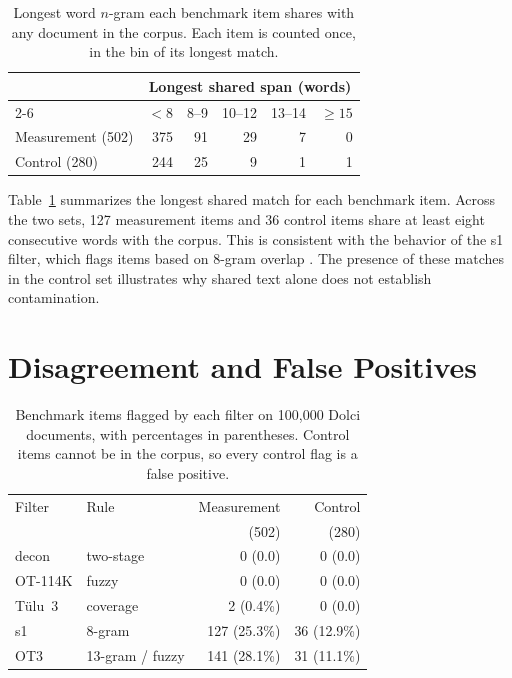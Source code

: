 \documentclass[11pt]{article}
\begin{document}
\begin{table}[t]
  \centering
  \small
  \setlength{\tabcolsep}{5pt}
  \begin{tabular}{@{}l rrrrr@{}}
    \toprule
    & \multicolumn{5}{c}{Longest shared span (words)} \\
    \cmidrule(l){2-6}
    & $<8$ & 8--9 & 10--12 & 13--14 & $\geq 15$ \\
    \midrule
    Measurement (502) & 375 & 91 & 29 & 7 & 0 \\
    Control (280)     & 244 & 25 &  9 & 1 & 1 \\
    \bottomrule
  \end{tabular}
  \caption{Longest word $n$-gram each benchmark item shares with any
  document in the corpus. Each item is counted once, in the bin of its
  longest match.}
  \label{tab:longest-match}
\end{table}

Table~\ref{tab:longest-match} summarizes the longest shared match for each benchmark item. Across the two sets, 127 measurement items and 36 control items share at least eight consecutive words with the corpus. This is consistent with the behavior of the s1 filter, which flags items based on 8-gram overlap \citep{s1}. The presence of these matches in the control set illustrates why shared text alone does not establish contamination.

\section{Disagreement and False Positives}
\label{sec:disagreement}

\begin{table}[t]
  \centering
  \small
  \setlength{\tabcolsep}{3pt}
  \begin{tabular}{@{}ll rr@{}}
    \toprule
    Filter & Rule & Measurement & Control \\
           &      & (502)       & (280)   \\
    \midrule
    decon             & two-stage &   0 (0.0)  &  0 (0.0)  \\
    OT-114K & fuzzy     &   0 (0.0)  &  0 (0.0)  \\
    T\"ulu~3          & coverage  &   2 (0.4\%)  &  0 (0.0)  \\
    s1                & 8-gram    & 127 (25.3\%) & 36 (12.9\%) \\
    OT3     & 13-gram / fuzzy & 141 (28.1\%) & 31 (11.1\%) \\
    \bottomrule
  \end{tabular}
  \caption{Benchmark items flagged by each filter on 100,000 Dolci
  documents, with percentages in parentheses. Control items cannot be
  in the corpus, so every control flag is a false positive.}
  \label{tab:filter-flags}
\end{table}
\end{document}
